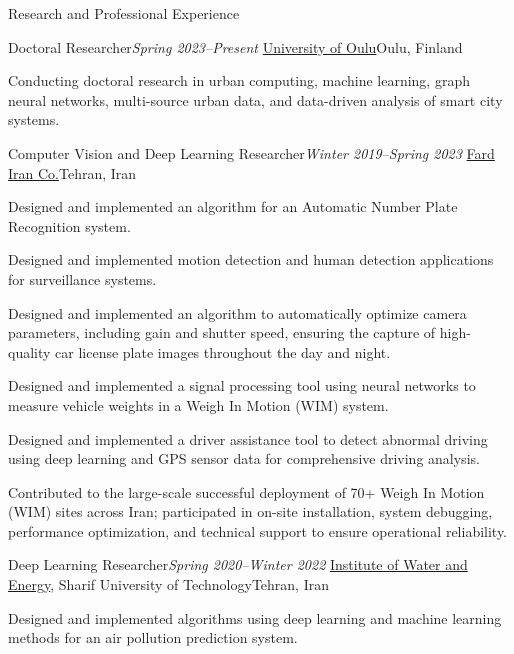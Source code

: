 \documentclass{resume}
\begin{document}
\begin{rSection}{Research and Professional Experience}
\vspace{+.1cm}

\begin{rSubsection}{Doctoral Researcher}{\em Spring 2023--Present}
{\href{https://www.oulu.fi/}{University of Oulu}}{Oulu, Finland}
    \item Conducting doctoral research in urban computing, machine learning, graph neural networks, multi-source urban data, and data-driven analysis of smart city systems.
\end{rSubsection}

\begin{rSubsection}{Computer Vision and Deep Learning Researcher}{\em Winter 2019--Spring 2023}
{\href{https://fardiran.com/en/}{Fard Iran Co.}}{Tehran, Iran}
    \item Designed and implemented an algorithm for an Automatic Number Plate Recognition system.
    \item Designed and implemented motion detection and human detection applications for surveillance systems.
    \item Designed and implemented an algorithm to automatically optimize camera parameters, including gain and shutter speed, ensuring the capture of high-quality car license plate images throughout the day and night.
    \item Designed and implemented a signal processing tool using neural networks to measure vehicle weights in a Weigh In Motion (WIM) system.
    \item Designed and implemented a driver assistance tool to detect abnormal driving using deep learning and GPS sensor data for comprehensive driving analysis.
    \item Contributed to the large-scale successful deployment of 70+ Weigh In Motion (WIM) sites across Iran; participated in on-site installation, system debugging, performance optimization, and technical support to ensure operational reliability.
\end{rSubsection}

\begin{rSubsection}{Deep Learning Researcher}{\em Spring 2020--Winter 2022}
{\href{http://iwe.sharif.edu/}{Institute of Water and Energy}, Sharif University of Technology}{Tehran, Iran}
    \item Designed and implemented algorithms using deep learning and machine learning methods for an air pollution prediction system.
\end{rSubsection}

\end{rSection}
\end{document}
